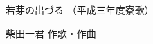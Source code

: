 \documentclass[10pt,b5j]{tarticle} %
\begin{document}
\begin{minipage}[c]{0.7\hsize} %
    \begin{center}
        {\LARGE
            若芽の出づる %
        }
        {\small 
            （平成三年度寮歌） %
        }
    \end{center}
\end{minipage}
\begin{minipage}[c]{0.3\hsize} %
    \begin{flushright} %
        柴田一君 作歌・作曲 %
    \end{flushright}
\end{minipage}
\end{document}
